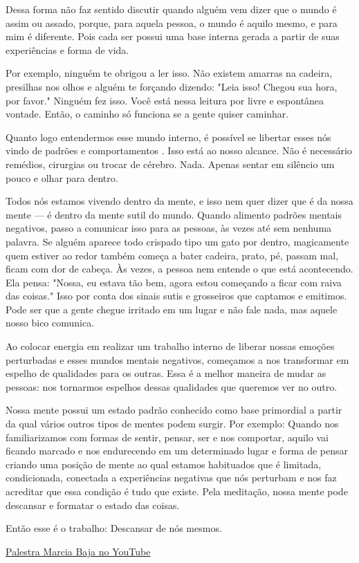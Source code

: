 Dessa forma não faz sentido discutir quando alguém vem dizer que o mundo é assim ou assado, porque, para aquela pessoa, o mundo é aquilo mesmo, e para mim é diferente. Pois cada ser possui uma base interna gerada a partir de suas experiências e forma de vida.

Por exemplo, ninguém te obrigou a ler isso. Não existem amarras na cadeira, presilhas nos olhos e alguém te forçando dizendo: "Leia isso! Chegou sua hora, por favor." Ninguém fez isso. Você está nessa leitura por livre e espontânea vontade. Então, o caminho só funciona se a gente quiser caminhar.

Quanto logo entendermos esse mundo interno, é possível se libertar esses nós vindo de padrões e comportamentos . Isso está ao nosso alcance. Não é necessário remédios, cirurgias ou trocar de cérebro. Nada. Apenas sentar em silêncio um pouco e olhar para dentro.

Todos nós estamos vivendo dentro da mente, e isso nem quer dizer que é da nossa mente — é dentro da mente sutil do mundo. Quando alimento padrões mentais negativos, passo a comunicar isso para as pessoas, às vezes até sem nenhuma palavra. Se alguém aparece todo crispado tipo um gato por dentro, magicamente quem estiver ao redor também começa a bater cadeira, prato, pé, passam mal, ficam com dor de cabeça. Às vezes, a pessoa nem entende o que está acontecendo. Ela pensa: "Nossa, eu estava tão bem, agora estou começando a ficar com raiva das coisas." Isso por conta dos sinais sutis e grosseiros que captamos e emitimos. Pode ser que a gente chegue irritado em um lugar e não fale nada, mas aquele nosso bico comunica.

Ao colocar energia em realizar um trabalho interno de liberar nossas emoções perturbadas e esses mundos mentais negativos, começamos a nos transformar em espelho de qualidades para os outras. Essa é a melhor maneira de mudar as pessoas: nos tornarmos espelhos dessas qualidades que queremos ver no outro.

Nossa mente possui um estado padrão conhecido como base primordial a partir da qual vários outros tipos de mentes podem surgir. Por exemplo: Quando nos familiarizamos com formas de sentir, pensar, ser e nos comportar, aquilo vai ficando marcado e nos endurecendo em um determinado lugar e forma de pensar criando uma posição de mente ao qual estamos habituados que é limitada, condicionada, conectada a experiências negativas que nós perturbam e nos faz acreditar que essa condição é tudo que existe. Pela meditação, nossa mente pode descansar e formatar o estado das coisas. 

Então esse é o trabalho: Descansar de nós mesmos.

\href{https://www.youtube.com/watch?v=WCxLdFbKu0w}{Palestra Marcia Baja no YouTube}

